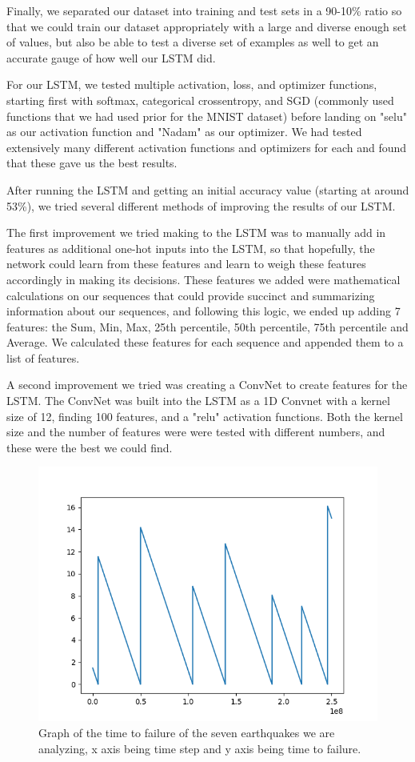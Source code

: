 \documentclass[11pt]{article}
\begin{document}
Finally, we separated our dataset into training and test sets in a 90-10\% ratio so that we could train our dataset appropriately with a large and diverse enough set of values, but also be able to test a diverse set of examples as well to get an accurate gauge of how well our LSTM did.

For our LSTM, we tested multiple activation, loss, and optimizer functions, starting first with softmax, categorical crossentropy, and SGD (commonly used functions that we had used prior for the MNIST dataset) before landing on "selu" as our activation function and "Nadam" as our optimizer. We had tested extensively many
different activation functions and optimizers for each and found that these gave us the best results.

After running the LSTM and getting an initial accuracy value (starting at around 53\%), we tried several different methods of improving the results of our LSTM.

The first improvement we tried making to the LSTM was to manually add in features as additional one-hot inputs into the LSTM, so that hopefully, the network could learn from these features and learn to weigh these features accordingly in making its decisions. These features we added were mathematical calculations on our sequences that could provide succinct and summarizing information about our sequences, and following this logic, we ended up adding 7 features: the Sum, Min, Max, 25th percentile, 50th percentile, 75th percentile and Average. We calculated these features for each sequence and appended them to a list of features.

A second improvement we tried was creating a ConvNet to create features for the LSTM. The ConvNet was built into the LSTM as a 1D Convnet with a kernel size of 12, finding 100 features, and a "relu" activation functions. Both the kernel size and the number of features were were tested with different numbers, and these were the best we could find.  

\begin{figure}
  \includegraphics[width=\linewidth]{Figure_1.png}
  \caption{Graph of the time to failure of the seven earthquakes we are analyzing, x axis being time step and y axis being time to failure.}
  \label{fig:graph1}
\end{figure}
\end{document}
